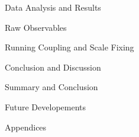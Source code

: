 \documentclass[twoside,english, a4paper, 11pt]{shared/uiofysmaster}
\begin{document}
\begin{part}{Data Analysis and Results}
	\begin{chapter}{Raw Observables}
  		\label{chap:obs_results}
  		
	\end{chapter}

	\begin{chapter}{Running Coupling and Scale Fixing}
		\label{chap:advance_results}
		
  	\end{chapter}
\end{part}

\begin{part}{Conclusion and Discussion}
	\label{part:conclusion}
	\begin{chapter}{Summary and Conclusion}
		\label{chap:conclusion}
		
	\end{chapter}
	
	\begin{chapter}{Future Developements}
		\label{chap:future}
		
	\end{chapter}
\end{part}


\begin{part}{Appendices}
	\begin{appendices}
		
	\end{appendices}
\end{part}




\end{document}
